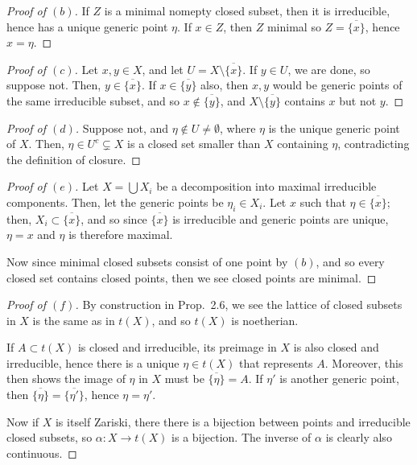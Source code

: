\documentclass[10pt]{article}
\theoremstyle{definition}
\theoremstyle{remark}
\numberwithin{equation}{section}
\numberwithin{figure}{subsubsection}
\begin{document}
\begin{proof}[Proof of $(b)$]
  If $Z$ is a minimal nomepty closed subset, then it is irreducible, hence has a unique generic point $\eta$. If $x \in Z$, then $Z$ minimal so $Z = \overline{\{x\}}$, hence $x = \eta$.
\end{proof}
\begin{proof}[Proof of $(c)$]
  Let $x,y \in X$, and let $U = X \setminus \overline{\{x\}}$. If $y \in U$, we are done, so suppose not. Then, $y \in \overline{\{x\}}$. If $x \in \overline{\{y\}}$ also, then $x,y$ would be generic points of the same irreducible subset, and so $x \notin \overline{\{y\}}$, and $X \setminus \overline{\{y\}}$ contains $x$ but not $y$.
\end{proof}
\begin{proof}[Proof of $(d)$]
  Suppose not, and $\eta \notin U \ne \emptyset$, where $\eta$ is the unique generic point of $X$. Then, $\eta \in U^c \subsetneq X$ is a closed set smaller than $X$ containing $\eta$, contradicting the definition of closure.
\end{proof}
\begin{proof}[Proof of $(e)$]
  Let $X = \bigcup X_i$ be a decomposition into maximal irreducible components. Then, let the generic points be $\eta_i \in X_i$. Let $x$ such that $\eta \in \overline{\{x\}}$; then, $X_i \subset \overline{\{x\}}$, and so since $\overline{\{x\}}$ is irreducible and generic points are unique, $\eta = x$ and $\eta$ is therefore maximal.
  \par Now since minimal closed subsets consist of one point by $(b)$, and so every closed set contains closed points, then we see closed points are minimal.
\end{proof}
\begin{proof}[Proof of $(f)$]
  By construction in Prop.~2.6, we see the lattice of closed subsets in $X$ is the same as in $t(X)$, and so $t(X)$ is noetherian.
  \par If $A \subset t(X)$ is closed and irreducible, its preimage in $X$ is also closed and irreducible, hence there is a unique $\eta \in t(X)$ that represents $A$. Moreover, this then shows the image of $\eta$ in $X$ must be $\overline{\{\eta\}} = A$. If $\eta'$ is another generic point, then $\overline{\{\eta\}} = \overline{\{\eta'\}}$, hence $\eta = \eta'$.
  \par Now if $X$ is itself Zariski, there there is a bijection between points and irreducible closed subsets, so $\alpha\colon X \to t(X)$ is a bijection. The inverse of $\alpha$ is clearly also continuous.
\end{proof}
\end{document}
